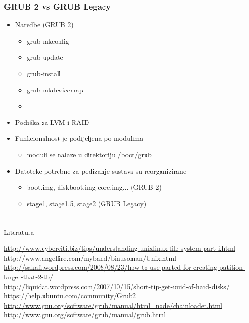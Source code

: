 \documentclass[croatian,t]{beamer} %
\begin{document}
	\begin{frame}[fragile]
	\frametitle{GRUB 2 vs GRUB Legacy}
		\begin{itemize}
			\item Naredbe (GRUB 2)
			\begin{itemize}
				\item grub-mkconfig
				\item grub-update
				\item grub-install
				\item grub-mkdevicemap
				\item ...
			\end{itemize}
			\item Podrška za LVM i RAID
			\item Funkcionalnost je podijeljena po modulima
			\begin{itemize}
				\item moduli se nalaze u direktoriju /boot/grub
			\end{itemize}
			\item Datoteke potrebne za podizanje sustava su reorganizirane
			\begin{itemize}
				\item boot.img, diskboot.img core.img... (GRUB 2)
				\item stage1, stage1.5, stage2 (GRUB Legacy)
			\end{itemize}
		\end{itemize}
	\end{frame}
	
	\section{}
	\begin{frame}{Literatura}
		\begin{tiny}
			\url{http://www.cyberciti.biz/tips/understanding-unixlinux-file-system-part-i.html} \\
			\url{http://www.angelfire.com/myband/binusoman/Unix.html} \\
			\url{http://sakafi.wordpress.com/2008/08/23/how-to-use-parted-for-creating-patition-larger-that-2-tb/} \\
			\url{http://liquidat.wordpress.com/2007/10/15/short-tip-get-uuid-of-hard-disks/} \\
			\url{https://help.ubuntu.com/community/Grub2} \\
			\url{http://www.gnu.org/software/grub/manual/html_node/chainloader.html} \\
			\url{http://www.gnu.org/software/grub/manual/grub.html} \\
		\end{tiny}
	\end{frame}
\end{document}
